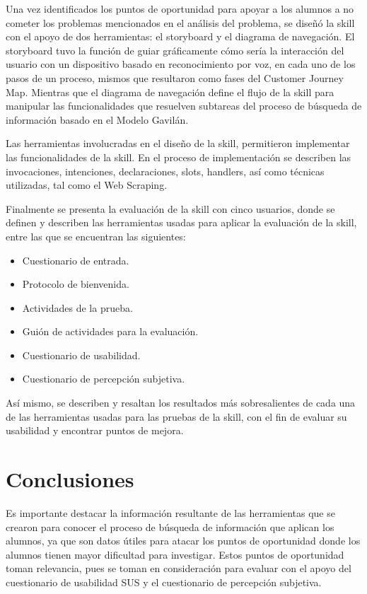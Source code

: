 Una vez identificados los puntos de oportunidad para apoyar a los alumnos a no cometer los problemas mencionados en el análisis del problema, se diseñó la skill con el apoyo de dos herramientas: el storyboard y el diagrama de navegación. El storyboard tuvo la función de guiar gráficamente cómo sería la interacción del usuario con un dispositivo basado en reconocimiento por voz, en cada uno de los pasos de un proceso, mismos que resultaron como fases del Customer Journey Map. Mientras que el diagrama de navegación define el flujo de la skill para manipular las funcionalidades que resuelven subtareas del proceso de búsqueda de información basado en el Modelo Gavilán.

Las herramientas involucradas en el diseño de la skill, permitieron implementar las funcionalidades de la skill. En el proceso de implementación se describen las invocaciones,  intenciones, declaraciones, slots, handlers, así como técnicas utilizadas, tal como el Web Scraping.

Finalmente se presenta la evaluación de la skill con cinco usuarios, donde se definen y describen las herramientas usadas para aplicar la evaluación de la skill, entre las que se encuentran las siguientes:

\begin{itemize}
  \item Cuestionario de entrada.
  \item Protocolo de bienvenida.
  \item Actividades de la prueba.
  \item Guión de actividades para la evaluación.
  \item Cuestionario de usabilidad.
  \item Cuestionario de percepción subjetiva.
\end{itemize}

Así mismo, se describen y resaltan los resultados más sobresalientes de cada una de las herramientas usadas para las pruebas de la skill, con el fin de evaluar su usabilidad y encontrar puntos de mejora.


\section{Conclusiones}
\label{ConclusionescapV}

Es importante destacar la información resultante de las herramientas que se crearon para conocer el proceso de búsqueda de información que aplican los alumnos, ya que son datos útiles para atacar los puntos de oportunidad donde los alumnos tienen mayor dificultad para investigar. Estos puntos de oportunidad toman relevancia, pues se toman en consideración para evaluar con el apoyo del cuestionario de usabilidad SUS y el cuestionario de percepción subjetiva.

